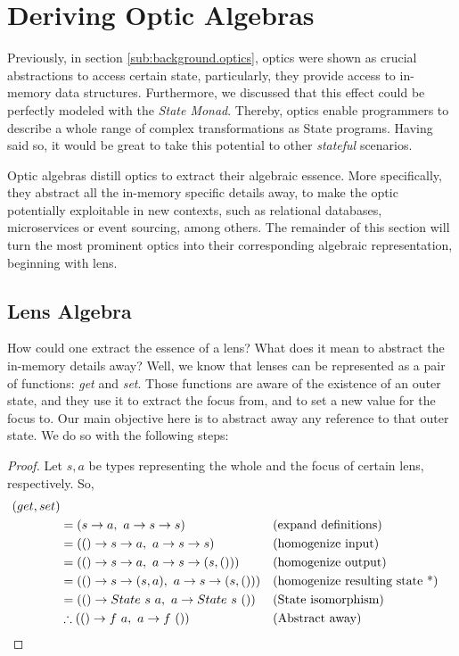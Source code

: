 \documentclass[a4paper]{article}
\begin{document}
\section{Deriving Optic Algebras}

Previously, in section \ref{sub:background.optics}, optics were shown as crucial
abstractions to access certain state, particularly, they provide access to
in-memory data structures. Furthermore, we discussed that this effect could be
perfectly modeled with the \emph{State Monad}. Thereby, optics enable
programmers to describe a whole range of complex transformations as State
programs. Having said so, it would be great to take this potential to other
\emph{stateful} scenarios.

Optic algebras distill optics to extract their algebraic essence. More
specifically, they abstract all the in-memory specific details away, to make the
optic potentially exploitable in new contexts, such as relational databases,
microservices or event sourcing, among others. The remainder of this section
will turn the most prominent optics into their corresponding algebraic
representation, beginning with lens.

\subsection{Lens Algebra}

How could one extract the essence of a lens? What does it mean to abstract the
in-memory details away? Well, we know that lenses can be represented as a pair
of functions: \emph{get} and \emph{set}. Those functions are aware of the
existence of an outer state, and they use it to extract the focus from, and to
set a new value for the focus to. Our main objective here is to abstract away
any reference to that outer state. We do so with the following steps:

\begin{proof}
  Let $s, a$ be types representing the whole and the focus of certain  lens,
  respectively. So,
  \begin{align*}
    (get, set) \\
    &= (s \rightarrow a,\ a \rightarrow s \rightarrow s) &&\text{(expand definitions)} \\
    &= (() \rightarrow s \rightarrow a,\ a \rightarrow s \rightarrow s) &&\text{(homogenize input)} \\
    &= (() \rightarrow s \rightarrow a,\ a \rightarrow s \rightarrow (s, ())) &&\text{(homogenize output)} \\
    &= (() \rightarrow s \rightarrow (s, a),\ a \rightarrow s \rightarrow (s, ())) &&\text{(homogenize resulting state *)} \\
    &= (() \rightarrow State\ s\ a,\ a \rightarrow State\ s\ ()) &&\text{(State isomorphism)} \\
    &\therefore (() \rightarrow f\ a,\ a \rightarrow f\ ()) &&\text{(Abstract away)}\qedhere
  \end{align*}
\end{proof}
\end{document}
